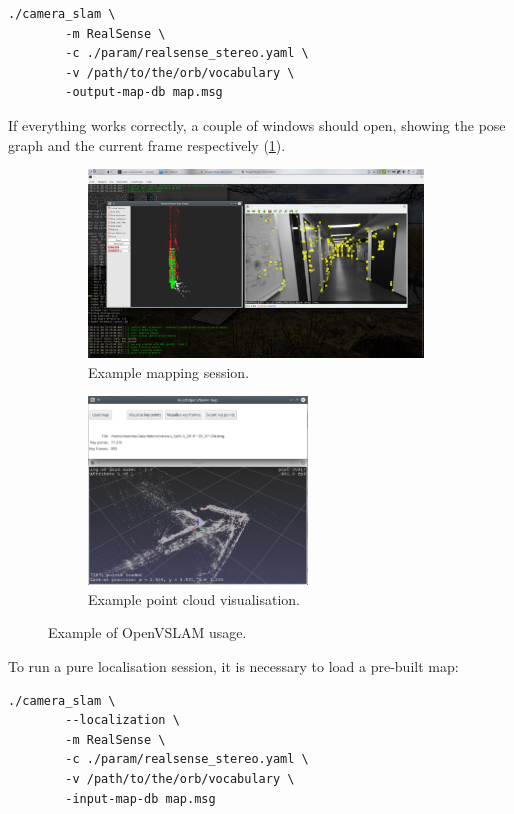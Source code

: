 \documentclass[11pt, letterpaper, twoside]{article}
\begin{document}
\begin{Verbatim}[samepage=true]
    ./camera_slam \
        -m RealSense \
        -c ./param/realsense_stereo.yaml \
        -v /path/to/the/orb/vocabulary \
        -output-map-db map.msg
\end{Verbatim}

If everything works correctly, a couple of windows should open, showing the
pose graph and the current frame respectively (\cref{fig:openvslam_mapping}).

\begin{figure}[tb]
    \centering
    \begin{subfigure}[t]{.59\textwidth}
        \centering
        \includegraphics[height=5cm]{openvslam.png}
        \caption{Example mapping session.}\label{fig:openvslam_mapping}
    \end{subfigure}
    \begin{subfigure}[t]{.39\textwidth}
        \centering
        \includegraphics[height=5cm]{load_map.png}
        \caption{Example point cloud visualisation.}\label{fig:openvslam_load_map}
    \end{subfigure}
    \caption{Example of OpenVSLAM usage.}\label{fig:openvslam}
\end{figure}

To run a pure localisation session, it is necessary to load a pre-built map:

\begin{Verbatim}[samepage=true]
    ./camera_slam \
        --localization \
        -m RealSense \
        -c ./param/realsense_stereo.yaml \
        -v /path/to/the/orb/vocabulary \
        -input-map-db map.msg
\end{Verbatim}
\end{document}
